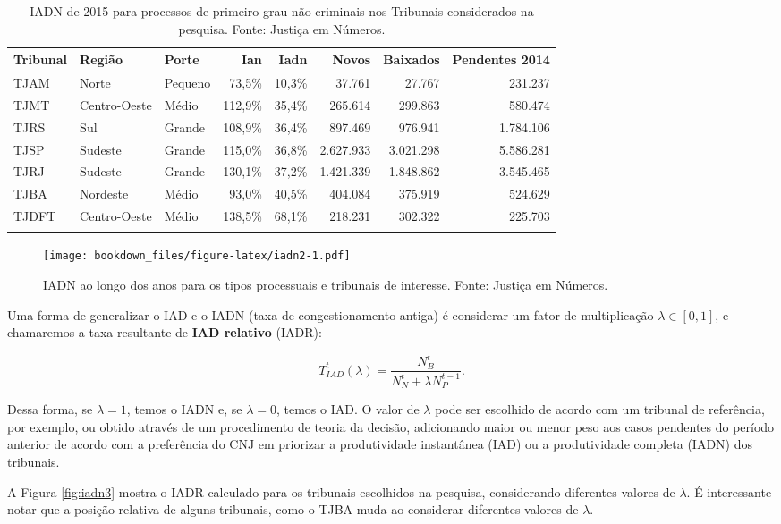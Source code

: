 \documentclass[]{report}
\begin{document}
\begin{longtable}{lllrrrrr}
\caption{IADN de 2015 para processos de primeiro grau não criminais nos Tribunais considerados na pesquisa. Fonte: Justiça em Números.} \\
  \hline
Tribunal & Região & Porte & Ian & Iadn & Novos & Baixados & Pendentes 2014 \\
  \hline
TJAM & Norte & Pequeno & 73,5\% & 10,3\% & 37.761 & 27.767 & 231.237 \\
  TJMT & Centro-Oeste & Médio & 112,9\% & 35,4\% & 265.614 & 299.863 & 580.474 \\
  TJRS & Sul & Grande & 108,9\% & 36,4\% & 897.469 & 976.941 & 1.784.106 \\
  TJSP & Sudeste & Grande & 115,0\% & 36,8\% & 2.627.933 & 3.021.298 & 5.586.281 \\
  TJRJ & Sudeste & Grande & 130,1\% & 37,2\% & 1.421.339 & 1.848.862 & 3.545.465 \\
  TJBA & Nordeste & Médio & 93,0\% & 40,5\% & 404.084 & 375.919 & 524.629 \\
  TJDFT & Centro-Oeste & Médio & 138,5\% & 68,1\% & 218.231 & 302.322 & 225.703 \\
   \hline
\hline
\label{iadn}
\end{longtable}

\begin{figure}[htbp]
\centering
\texttt{[image: bookdown\_files/figure-latex/iadn2-1.pdf]}
\caption{\label{fig:iadn2}IADN ao longo dos anos para os tipos processuais e
tribunais de interesse. Fonte: Justiça em Números.}
\end{figure}

Uma forma de generalizar o IAD e o IADN (taxa de congestionamento
antiga) é considerar um fator de multiplicação \(\lambda \in [0,1]\), e
chamaremos a taxa resultante de \textbf{IAD relativo} (IADR):

\[
T_{IAD}^t(\lambda) = \frac{N_B^t}{N_N^t + \lambda N_P^{t-1}}.
\]

Dessa forma, se \(\lambda = 1\), temos o IADN e, se \(\lambda = 0\),
temos o IAD. O valor de \(\lambda\) pode ser escolhido de acordo com um
tribunal de referência, por exemplo, ou obtido através de um
procedimento de teoria da decisão, adicionando maior ou menor peso aos
casos pendentes do período anterior de acordo com a preferência do CNJ
em priorizar a produtividade instantânea (IAD) ou a produtividade
completa (IADN) dos tribunais.

A Figura \ref{fig:iadn3} mostra o IADR calculado para os tribunais
escolhidos na pesquisa, considerando diferentes valores de \(\lambda\).
É interessante notar que a posição relativa de alguns tribunais, como o
TJBA muda ao considerar diferentes valores de \(\lambda\).
\end{document}
